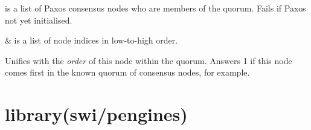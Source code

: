 \begin{description}
 is a list of Paxos consensus nodes who are members of the
quorum. Fails if Paxos not yet initialised.

\begin{arguments}
 & is a list of node indices in low-to-high order. \\
\end{arguments}

Unifies  with the \textit{order} of this node within the quorum.
Answers 1 if this node comes first in the known quorum of
consensus nodes, for example.
\end{description}

\chapter{library(swi/pengines)}\label{sec:pengines}


